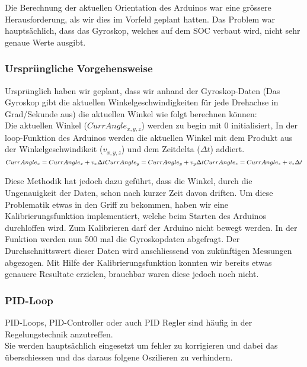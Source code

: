 
Die Berechnung der aktuellen Orientation des Arduinos war eine grössere Herausforderung,
als wir dies im Vorfeld geplant hatten. Das Problem war hauptsächlich, dass das Gyroskop, welches auf dem SOC verbaut wird, nicht sehr genaue Werte ausgibt.

\subsubsection{Ursprüngliche Vorgehensweise}
Ursprünglich haben wir geplant, dass wir anhand der Gyroskop-Daten 
(Das Gyroskop gibt die aktuellen Winkelgeschwindigkeiten für jede Drehachse in Grad/Sekunde aus) 
die aktuellen Winkel wie folgt berechnen können:\\

Die aktuellen Winkel (\begin{math}CurrAngle_{x,y,z}\end{math}) werden zu begin mit 0 initialisiert, In der loop-Funktion des Arduinos 
werden die aktuellen Winkel mit dem Produkt aus der Winkelgeschwindikeit (\begin{math}v_{x,y,z}\end{math}) und dem Zeitdelta (\begin{math}\Delta{t}\end{math}) addiert.\\

\begin{math}
  CurrAngle_x = CurrAngle_x + v_x \Delta t  \\
  CurrAngle_y = CurrAngle_y + v_y \Delta t  \\
  CurrAngle_z = CurrAngle_z + v_z \Delta t  \\
\end{math}

Diese Methodik hat jedoch dazu geführt, dass die Winkel, durch die Ungenauigkeit der Daten, schon nach kurzer Zeit davon driften.
Um diese Problematik etwas in den Griff zu bekommen, haben wir eine Kalibrierungsfunktion implementiert, welche beim Starten des Arduinos durchloffen wird.
Zum Kalibrieren darf der Arduino nicht bewegt werden. In der Funktion werden nun 500 mal die Gyroskopdaten abgefragt.
Der Durchschnittswert dieser Daten wird anschliessend von zukünftigen Messungen abgezogen.
Mit Hilfe der Kalibrierungsfunktion konnten wir bereits etwas genauere Resultate erzielen, brauchbar waren diese jedoch  noch nicht.



\subsubsection{PID-Loop}
PID-Loops, PID-Controller oder auch PID Regler sind häufig in der Regelungstechnik anzutreffen.\\
Sie werden hauptsächlich eingesetzt um fehler zu korrigieren und dabei das überschiessen und das daraus folgene Oszilieren zu verhindern.\\

